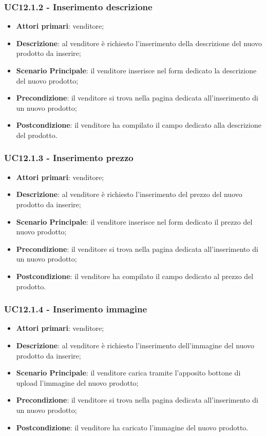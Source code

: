 \subsubsection{UC12.1.2 - Inserimento descrizione}
\begin{itemize}
\item \textbf{Attori primari}: venditore;
\item \textbf{Descrizione}: al venditore è richiesto l'inserimento della descrizione del nuovo prodotto da inserire;
\item \textbf{Scenario Principale}: il venditore inserisce nel form dedicato la descrizione del nuovo prodotto;
\item \textbf{Precondizione}: il venditore si trova nella pagina dedicata all'inserimento di un nuovo prodotto;
\item \textbf{Postcondizione}: il venditore ha compilato il campo dedicato alla descrizione del prodotto.
\end{itemize}

\subsubsection{UC12.1.3 - Inserimento prezzo}
\begin{itemize}
\item \textbf{Attori primari}: venditore;
\item \textbf{Descrizione}: al venditore è richiesto l'inserimento del prezzo del nuovo prodotto da inserire;
\item \textbf{Scenario Principale}: il venditore inserisce nel form dedicato il prezzo del nuovo prodotto;
\item \textbf{Precondizione}: il venditore si trova nella pagina dedicata all'inserimento di un nuovo prodotto;
\item \textbf{Postcondizione}: il venditore ha compilato il campo dedicato al prezzo del prodotto.
\end{itemize}

\subsubsection{UC12.1.4 - Inserimento immagine}
\begin{itemize}
\item \textbf{Attori primari}: venditore;
\item \textbf{Descrizione}: al venditore è richiesto l'inserimento dell'immagine del nuovo prodotto da inserire;
\item \textbf{Scenario Principale}: il venditore carica tramite l'apposito bottone di upload l'immagine del nuovo prodotto;
\item \textbf{Precondizione}: il venditore si trova nella pagina dedicata all'inserimento di un nuovo prodotto;
\item \textbf{Postcondizione}: il venditore ha caricato l'immagine del nuovo prodotto.
\end{itemize}

